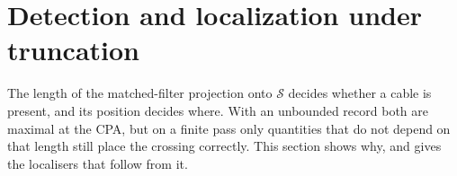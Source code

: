 \section{Detection and localization under truncation}\label{subsec:det_loc_trunc}

The length of the matched-filter projection onto $\mathcal{S}$ decides whether a cable is present, and its position decides where. With an unbounded record both are maximal at the CPA, but on a finite pass only quantities that do not depend on that length still place the crossing correctly. This section shows why, and gives the localisers that follow from it.



